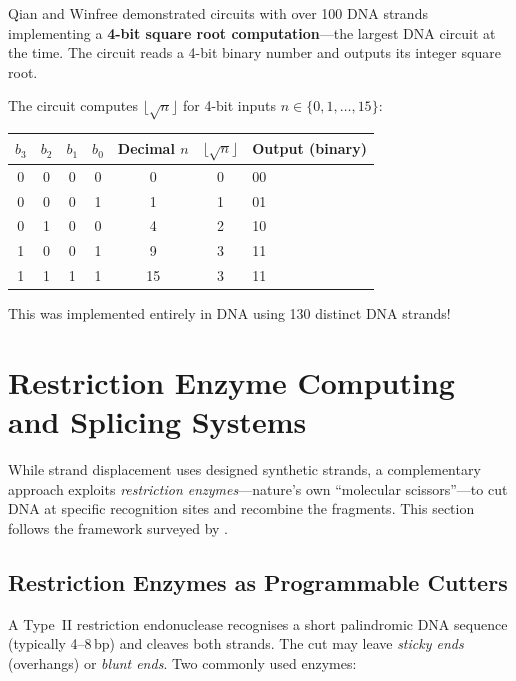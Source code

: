 Qian and Winfree demonstrated circuits with over 100 DNA strands implementing a \textbf{4-bit square root computation}---the largest DNA circuit at the time. The circuit reads a 4-bit binary number and outputs its integer square root.

\begin{example}
The circuit computes $\lfloor\sqrt{n}\rfloor$ for 4-bit inputs $n \in \{0, 1, \ldots, 15\}$:

\begin{center}
\renewcommand{\arraystretch}{1.15}
\begin{tabular}{cccc|cc|l}
\toprule
$b_3$ & $b_2$ & $b_1$ & $b_0$ & Decimal $n$ & $\lfloor\sqrt{n}\rfloor$ & Output (binary) \\
\midrule
0 & 0 & 0 & 0 & 0 & 0 & 00 \\
0 & 0 & 0 & 1 & 1 & 1 & 01 \\
0 & 1 & 0 & 0 & 4 & 2 & 10 \\
1 & 0 & 0 & 1 & 9 & 3 & 11 \\
1 & 1 & 1 & 1 & 15 & 3 & 11 \\
\bottomrule
\end{tabular}
\end{center}

This was implemented entirely in DNA using 130 distinct DNA strands!
\end{example}

\section{Restriction Enzyme Computing and Splicing Systems}
\label{sec:restriction-splicing}

While strand displacement uses designed synthetic strands, a complementary approach exploits \emph{restriction enzymes}---nature's own ``molecular scissors''---to cut DNA at specific recognition sites and recombine the fragments.  This section follows the framework surveyed by \citet{daleykari2002}.

\subsection{Restriction Enzymes as Programmable Cutters}

A Type~II restriction endonuclease recognises a short palindromic DNA sequence (typically 4--8\,bp) and cleaves both strands.  The cut may leave \emph{sticky ends} (overhangs) or \emph{blunt ends}.  Two commonly used enzymes:

